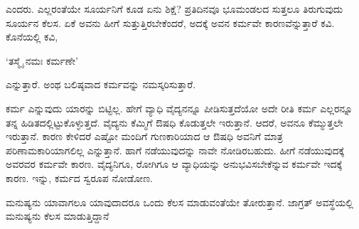 ಎಂದರು. ಎಲ್ಲರಂತೆಯೇ ಸೂರ್ಯನಿಗೆ ಕೂಡ ಏನು ಶಿಕ್ಷೆ? ಪ್ರತಿದಿನವೂ ಭೂಮಂಡಲದ ಸುತ್ತಲೂ ತಿರುಗುವುದು ಸೂರ್ಯನ ಕೆಲಸ. ಏಕೆ ಅವನು ಹೀಗೆ ಸುತ್ತುತ್ತಿರಬೇಕೆಂದರೆ, ಅದಕ್ಕೆ ಅವನ ಕರ್ಮವೇ ಕಾರಣವೆನ್ನುತ್ತಾರೆ ಕವಿ. ಕೊನೆಯಲ್ಲಿ ಕವಿ,

\begin{shloka}
`ತಸ್ಮೈ ನಮಃ ಕರ್ಮಣೇ'
\end{shloka}

ಎನ್ನುತ್ತಾರೆ. ಅಂಥ ಬಲಿಷ್ಠವಾದ ಕರ್ಮವನ್ನು ನಮಸ್ಕರಿಸುತ್ತಾರೆ.

ಕರ್ಮ ಎನ್ನುವುದು ಯಾರನ್ನು ಬಿಟ್ಟಿಲ್ಲ. ಹೇಗೆ ವ್ಯಾಧಿ ವೈದ್ಯನನ್ನೂ ಪೀಡಿಸುತ್ತದೆಯೋ ಅದೇ ರೀತಿ ಕರ್ಮ ಎಲ್ಲರನ್ನೂ ತನ್ನ ಹಿಡಿತದಲ್ಲಿಟ್ಟುಕೊಳ್ಳುತ್ತದೆ. ವೈದ್ಯನು ಕೆಮ್ಮಿಗೆ ಔಷಧಿ ಕೊಡುತ್ತಲೇ ಇರುತ್ತಾನೆ. ಆದರೆ, ಅವನೂ ಕೆಮ್ಮುತ್ತಲೇ ಇರುತ್ತಾನೆ. ಕಾರಣ ಕೇಳಿದರೆ ಎಷ್ಟೋ ಮಂದಿಗೆ ಗುಣಕಾರಿಯಾದ ಆ ಔಷಧಿ ಅವನಿಗೆ ಮಾತ್ರ ಪರಿಣಾಮಕಾರಿಯಾಗಲಿಲ್ಲ ಎನ್ನುತ್ತಾನೆ. ಹಾಗೆ ನಡೆಯುವುದನ್ನು ನಾವೇ ನೋಡಿರಬಹುದು. ಹೀಗೆ ನಡೆಯುವುದಕ್ಕೆ ಅವರವರ ಕರ್ಮವೇ ಕಾರಣ. ವೈದ್ಯನಿಗೂ, ರೋಗಿಗೂ ಆ ವ್ಯಾಧಿಯನ್ನು ಅನುಭವಿಸಬೇಕೆನ್ನುವ ಕರ್ಮವೇ ಇದಕ್ಕೆ ಕಾರಣ. ಇನ್ನು, ಕರ್ಮದ ಸ್ವರೂಪ ನೋಡೋಣ.

ಮನುಷ್ಯನು ಯಾವಾಗಲೂ ಯಾವುದಾದರೂ ಒಂದು ಕೆಲಸ ಮಾಡುವಂತೆಯೇ ತೋರುತ್ತಾನೆ. ಜಾಗ್ರತ್ ಅವಸ್ಥೆಯಲ್ಲಿ ಮನುಷ್ಯನು ಕೆಲಸ ಮಾಡುತ್ತಿದ್ದಾನೆ 



